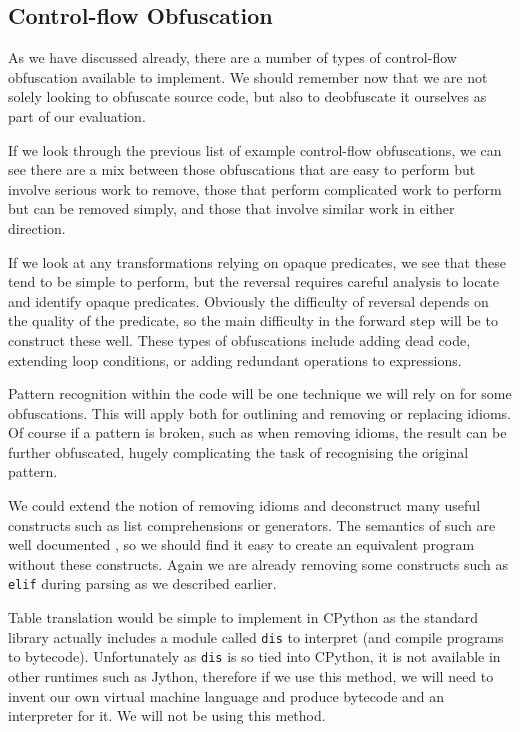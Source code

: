 \documentclass{report}
\begin{document}
\subsection{Control-flow Obfuscation}

As we have discussed already, there are a number of types of control-flow obfuscation available to implement. We should
remember now that we are not solely looking to obfuscate source code, but also to deobfuscate it ourselves as part of
our evaluation.

If we look through the previous list of example control-flow obfuscations, we can see there are a mix between those
obfuscations that are easy to perform but involve serious work to remove, those that perform complicated work to perform
but can be removed simply, and those that involve similar work in either direction.

If we look at any transformations relying on opaque predicates, we see that these tend to be simple to perform, but the
reversal requires careful analysis to locate and identify opaque predicates. Obviously the difficulty of reversal depends
on the quality of the predicate, so the main difficulty in the forward step will be to construct these well. These types
of obfuscations include adding dead code, extending loop conditions, or adding redundant operations to expressions.

Pattern recognition within the code will be one technique we will rely on for some obfuscations. This will apply both for
outlining and removing or replacing idioms. Of course if a pattern is broken, such as when removing idioms, the result can
be further obfuscated, hugely complicating the task of recognising the original pattern.

We could extend the notion of removing idioms and deconstruct many useful constructs such as list comprehensions or generators.
The semantics of such are well documented \cite{genexpr}, so we should find it easy to create an equivalent program without
these constructs. Again we are already removing some constructs such as \texttt{elif} during parsing as we described earlier.

Table translation would be simple to implement in CPython as the standard library actually includes a module called \texttt{dis}
to interpret (and compile programs to bytecode). Unfortunately as \texttt{dis} is so tied into CPython, it is not available in
other runtimes such as Jython, therefore if we use this method, we will need to invent our own virtual machine language and
produce bytecode and an interpreter for it. We will not be using this method. 
\end{document}
